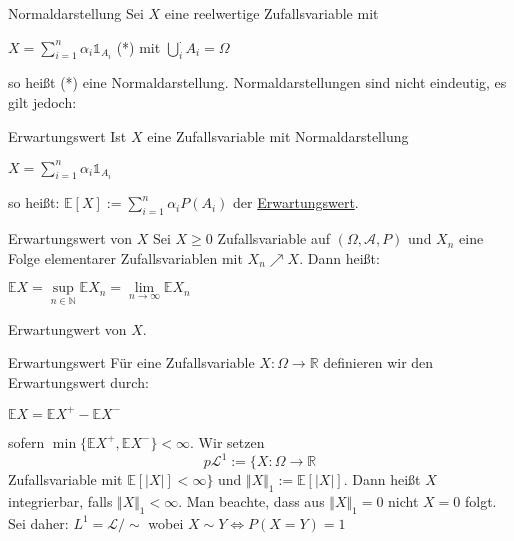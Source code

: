 \documentclass[avery5371,grid,frame]{flashcards} %
\newcommand{\1}{ \mathbb{1} } %
\begin{document}
\begin{flashcard}[Definition]{Normaldarstellung}
  Sei $X$ eine reelwertige Zufallsvariable mit
  \begin{center}
    $X=\sum\limits_{i=1}^n\alpha_i\1_{A_i}$ (*) mit $\bigcup_i^\cdot
    A_i=\Omega$
  \end{center}
  so heißt (*) eine Normaldarstellung. Normaldarstellungen sind nicht eindeutig, es gilt jedoch:
\end{flashcard}

\begin{flashcard}[Definition]{Erwartungswert}
  Ist $X$ eine Zufallsvariable mit Normaldarstellung
  \begin{center}
    $X=\sum\limits_{i=1}^n\alpha_i\1_{A_i}$
  \end{center}
  so heißt: $\mathbb{E}[X]:=\sum\limits_{i=1}^n\alpha_iP(A_i)$ der \underline{Erwartungswert}.
\end{flashcard}

\begin{flashcard}[Definition]{Erwartungswert von $X$}
  Sei $X\geq 0$ Zufallsvariable auf $(\Omega,\mathcal{A},P)$ und $X_n$ eine Folge
  elementarer Zufallsvariablen mit $X_n\nearrow X$. Dann heißt:
  \begin{center}
    $\mathbb{E}X=\sup\limits_{n\in
      \mathbb{N}}\mathbb{E}X_n=\lim\limits_{n \to
      \infty}\mathbb{E}X_n$
  \end{center}
  Erwartungwert von $X$.
\end{flashcard}

\begin{flashcard}[Definition]{Erwartungswert}
  Für eine Zufallsvariable $X:\Omega \to \mathbb{R}$ definieren wir den
  Erwartungswert durch:

    $\mathbb{E}X=\mathbb{E}X^+-\mathbb{E}X^-$

  sofern $\min\{\mathbb{E}X^+,\mathbb{E}X^-\}<\infty$.
  Wir setzen
  \[p\mathcal{L}^1:=\{X:\Omega \to \mathbb{R}\] Zufallsvariable mit $\mathbb{E}[|X|]< \infty \}$
  und $\Vert X\Vert_1:=\mathbb{E}[|X|]$. Dann heißt $X$ integrierbar, falls $\Vert X \Vert_1 < \infty$.
  Man beachte, dass aus $\Vert X \Vert_1=0$ nicht $X=0$ folgt. Sei daher:
  $L^1=\mathcal{L}/\sim$ wobei $X\sim Y \Leftrightarrow P(X=Y)=1$
\end{flashcard}
\end{document}
